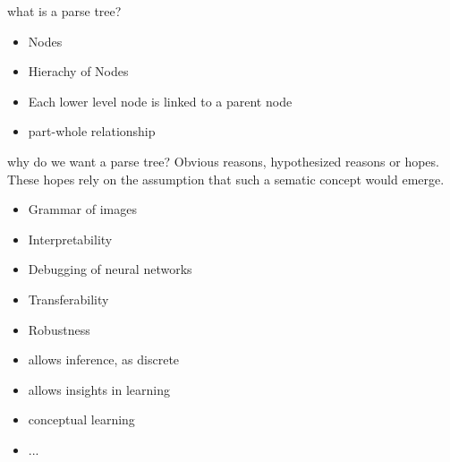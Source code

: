 \documentclass{article}
\begin{document}
what is a parse tree?
\begin{itemize}
	\item Nodes
	\item Hierachy of Nodes
	\item Each lower level node is linked to a parent node
	\item part-whole relationship
\end{itemize}
why do we want a parse tree? Obvious reasons, hypothesized reasons or hopes. These hopes rely on the assumption that such a sematic concept would emerge.
\begin{itemize}
	\item Grammar of images
	\item Interpretability
	\item Debugging of neural networks
	\item Transferability
	\item Robustness
	\item allows inference, as discrete
	\item allows insights in learning
	\item conceptual learning
	\item ...
\end{itemize}
\end{document}
